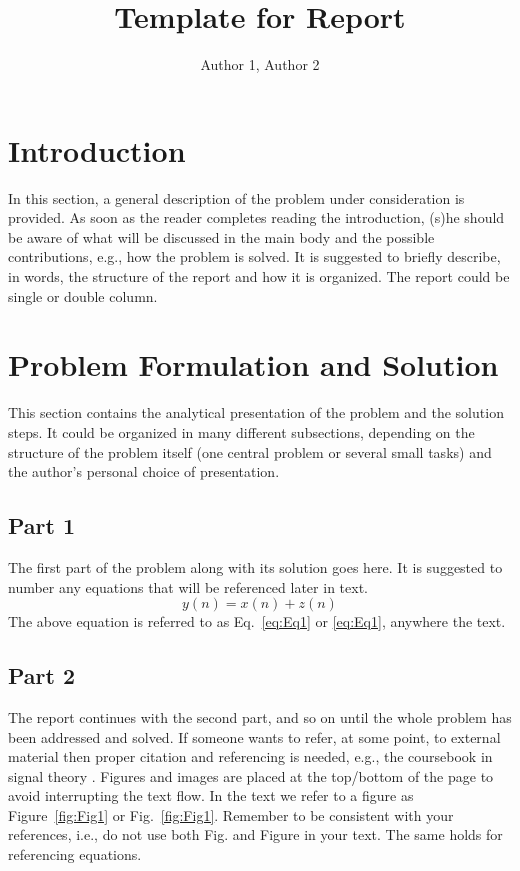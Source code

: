 \documentclass[twocolumn, 12pt]{IEEEtran}
\begin{document}
\title{Template for Report}
\author{Author 1, Author 2}

\maketitle

\section{Introduction}
In this section, a general description of the problem under consideration is provided. 
As soon as the reader completes reading the introduction, (s)he should be aware of what 
will be discussed in the main body and the possible contributions, e.g., how the problem 
is solved. It is suggested to briefly describe, in words, the structure of the report 
and how it is organized. The report could be single or double column.

\section{Problem Formulation and Solution}
This section contains the analytical presentation of the problem and the solution steps. 
It could be organized in many different subsections, depending on the structure of the 
problem itself (one central problem or several small tasks) and the author's personal 
choice of presentation.

\subsection{Part 1}
The first part of the problem along with its solution goes here. It is suggested to number 
any equations that will be referenced later in text.
\begin{equation} \label{eq:Eq1}
y(n)=x(n)+z(n)
\end{equation}
The above equation is referred to as Eq.~\eqref{eq:Eq1} or \eqref{eq:Eq1}, anywhere the text. 

\subsection{Part 2}
The report continues with the second part, and so on until the whole problem has been 
addressed and solved. If someone wants to refer, at some point, to external material 
then proper citation and referencing is needed, e.g., the coursebook in signal theory 
\cite{HanOttHjalm}. Figures and images are placed at the top/bottom of the page to 
avoid interrupting the text flow. In the text we refer to a figure as Figure~\ref{fig:Fig1} 
or Fig.~\ref{fig:Fig1}. Remember to be consistent with your references, i.e., do not 
use both Fig. and Figure in your text. The same holds for referencing equations.
\end{document}
